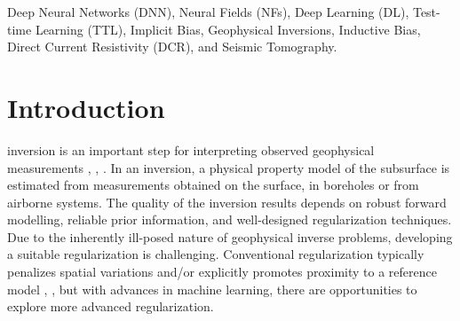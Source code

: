 \documentclass[lettersize,journal]{IEEEtran}
\begin{document}
\begin{IEEEkeywords}
Deep Neural Networks (DNN), Neural Fields (NFs), Deep Learning (DL), Test-time Learning (TTL), Implicit Bias, Geophysical Inversions, Inductive Bias, Direct Current Resistivity (DCR), and Seismic Tomography.
\end{IEEEkeywords}

\section{Introduction}
\label{sec:1}
 inversion is an important step for interpreting observed geophysical measurements \cite{menke_1989}, \cite{ref47}, \cite{cowan_airborne_2025}. In an inversion, a physical property model of the subsurface is estimated from measurements obtained on the surface, in boreholes or from airborne systems. The quality of the inversion results depends on robust forward modelling, reliable prior information, and well-designed regularization techniques. Due to the inherently ill-posed nature of geophysical inverse problems, developing a suitable regularization is challenging. Conventional regularization typically penalizes spatial variations and/or explicitly promotes proximity to a reference model \cite{fournier_inversion_2019}, \cite{Soler2025-kh}, but with advances in machine learning, there are opportunities to explore more advanced regularization.
\end{document}
